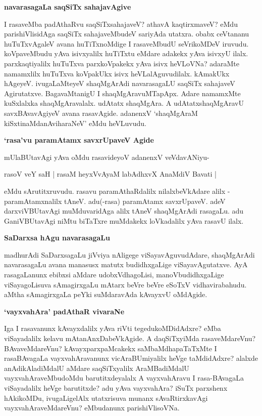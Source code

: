 {\bigskip
\noindent
{\large\bf navarasagaLa saqSiTx sahajavAgive}}\label{page222}
\medskip

\noindent
I rasaveMba padAthaRvu saqSiTxsahajaveV? athavA kaqtirxmaveV? eMdu pari\-shiVlisidAga saqSiTx sahaja\-veMbudeV sariyAda utatxra. obabx ceVtananu huTuTxvAgaleV avana huTiTxnoMdige I rasaveMbudU seVrikoMDeV iruvudu. koVpaveMbudu yAva isivxyalilx huTiTxtu eMdare adakekx yAva isivxyU ilalx. parxkaqtiyalilx huTuTxva parxkoVpakekx yAva isivx heVLoVNa? adaraMte namamxlilx huTuTxva koVpakUkx isivx heVLalAguvudilalx. kAmakUkx hAgeyeV. ivugaLaMteyeV shaqMgArAdi navarasagaLU saqSiTx sahajaveV Agirutatxve. BagavaMtanigU I shaqMgAravuMTapApx. Adare namamxMte kuSxlalxka shaqMgAravalalx. udAtatx shaqMgAra. A udAtatxshaqMgAravU savxBAvavAgiyeV avana rasavAgide. adanenxV `shaqMgAraM kiSxtinaMdanAviharaNeV' eMdu heVLuvudu.

{\bigskip
\noindent
{\large\bf `rasa'vu paramAtamx savxrUpaveV Agide}}\label{page222}
\medskip

\noindent
mUlaBUtavAgi yAva oMdu rasavideyoV adanenxV veVdavANiyu-

\begin{shloka}
rasoV veY saH | rasaM heyxVvAyaM labAdhxvX AnaMdiV Bavati |
\end{shloka}

\noindent
eMdu sArutitxruvudu. rasavu paramAthaRdalilx nilalxbeVkAdare alilx - paramAtamxnalilx tAneV. adu(-rasa) paramAtamx savxrU\-paveV. adeV darxviVBUtavAgi muMduvaridAga alilx tAneV shaqMgArAdi rasagaLu. adu GaniVBUtavAgi niMtu biTaTxre muMdakekx loVkadalilx yAva rasavU ilalx.

{\bigskip
\noindent
{\large\bf SaDarxsa hAgu navarasagaLu}}\label{page223}
\medskip

\noindent
madhurAdi SaDarxsagaLu jiVviya nAligege viSayavAguvudAdare, shaqMgArAdi navarasagaLu avana manasusx matutx budidhxgaLige viSayavAgutatxve. AyA rasagaLanunx ebibxsi aMdare udobxVdhagoLisi, manoV\-budidhxgaLige viSayagoLisuva sAmagirxgaLu mAtarx beVre beVre eSoTxV vidhavirabahudu. aMtha sAmagirxgaLa peYki suMdaravAda kAvayxvU oMdAgide. 

{\bigskip
\noindent
{\large\bf `vayxvahAra' padAthaR vivaraNe}}\label{page223}
\medskip

\noindent
Iga I rasavanunx kAvayxdalilx yAva riVti tegedukoMDidAdxre? eMba viSayadalilx kelavu mAtanAnxDa\-beVkAgide. A daqSiTxyiMda rasaveMdareVnu? BAvaveMdareVnu? kAvayxparxpaMcakekx saMbaMdhapaTaTxMte I rasaBAvagaLa vayxvahAravanunx vicAraBUmi\-yalilx heVge taMdidAdxre? alalxde anAdikAladiMdalU aMdare saqSiTxyalilx AraMBadiMdalU vayxvahAraveMbudoMdu barutitxdeyalalx A vayxvahAravu I rasa-BAvagaLa viSayadalilx heVge barutitxde? adu yAva vayxvahAra? iSuTx parxshenx hAkikoMDu, ivugaLigelAlx utatxrisuva munanx sAvaRtirxkavAgi vayxvahAraveMdareVnu? eMbudanunx parishiVlisoVNa.

